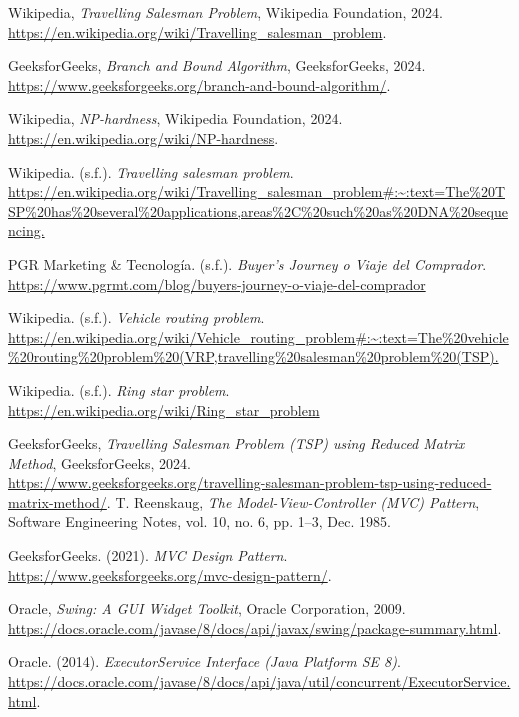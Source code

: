 \documentclass{ieeetj}
\begin{document}

\begin{thebibliography}{9}
Wikipedia, \textit{Travelling Salesman Problem}, Wikipedia Foundation, 2024. \\
\url{https://en.wikipedia.org/wiki/Travelling_salesman_problem}.

GeeksforGeeks, \textit{Branch and Bound Algorithm}, GeeksforGeeks, 2024. \\
\url{https://www.geeksforgeeks.org/branch-and-bound-algorithm/}.

Wikipedia, \textit{NP-hardness}, Wikipedia Foundation, 2024. \\
\url{https://en.wikipedia.org/wiki/NP-hardness}.

Wikipedia. (s.f.). \textit{Travelling salesman problem}.\\
\url{https://en.wikipedia.org/wiki/Travelling_salesman_problem#:~:text=The%20TSP%20has%20several%20applications,areas%2C%20such%20as%20DNA%20sequencing.}

PGR Marketing & Tecnología. (s.f.). \textit{Buyer's Journey o Viaje del Comprador}.\\
\url{https://www.pgrmt.com/blog/buyers-journey-o-viaje-del-comprador}

Wikipedia. (s.f.). \textit{Vehicle routing problem}.\\
\url{https://en.wikipedia.org/wiki/Vehicle_routing_problem#:~:text=The%20vehicle%20routing%20problem%20(VRP,travelling%20salesman%20problem%20(TSP).}

Wikipedia. (s.f.). \textit{Ring star problem}.\\
\url{https://en.wikipedia.org/wiki/Ring_star_problem}


GeeksforGeeks, \textit{Travelling Salesman Problem (TSP) using Reduced Matrix Method}, GeeksforGeeks, 2024. \\
\url{https://www.geeksforgeeks.org/travelling-salesman-problem-tsp-using-reduced-matrix-method/}.
T. Reenskaug, \textit{The Model-View-Controller (MVC) Pattern}, Software Engineering Notes, vol. 10, no. 6, pp. 1–3, Dec. 1985.

GeeksforGeeks. (2021). \textit{MVC Design Pattern}. \\ \url{https://www.geeksforgeeks.org/mvc-design-pattern/}.

Oracle, \textit{Swing: A GUI Widget Toolkit}, Oracle Corporation, 2009. \\ \url{https://docs.oracle.com/javase/8/docs/api/javax/swing/package-summary.html}.

Oracle. (2014). \textit{ExecutorService Interface (Java Platform SE 8)}. \\ \url{https://docs.oracle.com/javase/8/docs/api/java/util/concurrent/ExecutorService.html}.



\end{thebibliography}
\end{document}
